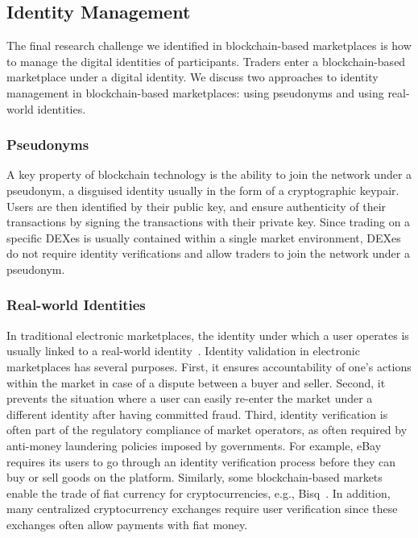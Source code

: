 \subsection{Identity Management}
The final research challenge we identified in blockchain-based marketplaces is how to manage the digital identities of participants.
Traders enter a blockchain-based marketplace under a digital identity.
We discuss two approaches to identity management in blockchain-based marketplaces: using pseudonyms and using real-world identities.

\subsubsection{Pseudonyms}
A key property of blockchain technology is the ability to join the network under a pseudonym, a disguised identity usually in the form of a cryptographic keypair.
Users are then identified by their public key, and ensure authenticity of their transactions by signing the transactions with their private key.
Since trading on a specific DEXes is usually contained within a single market environment, DEXes do not require identity verifications and allow traders to join the network under a pseudonym.

\subsubsection{Real-world Identities}
In traditional electronic marketplaces, the identity under which a user operates is usually linked to a real-world identity~\cite{subramanian2017decentralized}.
Identity validation in electronic marketplaces has several purposes.
First, it ensures accountability of one's actions within the market in case of a dispute between a buyer and seller.
Second, it prevents the situation where a user can easily re-enter the market under a different identity after having committed fraud.
Third, identity verification is often part of the regulatory compliance of market operators, as often required by anti-money laundering policies imposed by governments.
For example, eBay requires its users to go through an identity verification process before they can buy or sell goods on the platform.
Similarly, some blockchain-based markets enable the trade of fiat currency for cryptocurrencies, e.g., Bisq~\cite{bisq}.
In addition, many centralized cryptocurrency exchanges require user verification since these exchanges often allow payments with fiat money.

